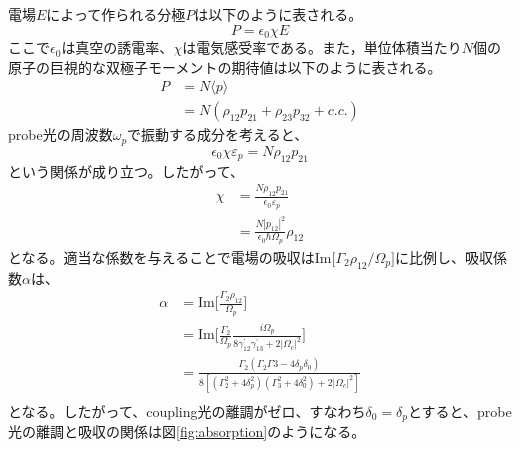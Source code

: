 \documentclass[dvipdfmx]{jsarticle}
\begin{document}
電場$E$によって作られる分極$P$は以下のように表される。
\begin{equation}
    P = \epsilon_0 \chi E
\end{equation}
ここで$\epsilon_0$は真空の誘電率、$\chi$は電気感受率である。また，単位体積当たり$N$個の原子の巨視的な双極子モーメントの期待値は以下のように表される。
\begin{equation}
\begin{split}
    P &= N\langle p \rangle \\
    &= N(\rho_{12}p_{21} + \rho_{23}p_{32} + c.c.)
\end{split}
\end{equation}
probe光の周波数$\omega_p$で振動する成分を考えると、
\begin{equation}
     \epsilon_0 \chi \varepsilon_p = N\rho_{12}p_{21} 
\end{equation}
という関係が成り立つ。したがって、
\begin{equation}
\begin{split}
    \chi &=  \frac{N\rho_{12}p_{21}}{\epsilon_0 \varepsilon_p} \\
    &= \frac{N |p_{12}|^2}{\epsilon_0 \hbar \Omega_p}\rho_{12}
\end{split}
\end{equation}
となる。適当な係数を与えることで電場の吸収は$\text{Im}\lbrack \Gamma_2 \rho_{12} /\Omega_p \rbrack$に比例し、吸収係数$\alpha$は、
\begin{equation}
\begin{split}
\label{eit-absorption}
    \alpha &=  \text{Im} \lbrack \frac{\Gamma_2 \rho_{12}}{\Omega_p} \rbrack \\
    &= \text{Im} \lbrack \frac{\Gamma_2}{\Omega_p} \frac{i\Omega_p}{8\gamma_{12}^{'}\gamma_{13}^{'} + 2|\Omega_c|^2} \rbrack \\
    &= \frac{\Gamma_2 \left( \Gamma_2\Gamma3 - 4\delta_p\delta_0 \right)}{8\left[ (\Gamma_2^2 + 4\delta_p^2)(\Gamma_3^2 + 4\delta_0^2) + 2|\Omega_c|^2 \right]} \\
\end{split}
\end{equation}
となる。したがって、coupling光の離調がゼロ、すなわち$\delta_0 = \delta_p$とすると、probe光の離調と吸収の関係は図\ref{fig:absorption}のようになる。
\end{document}
